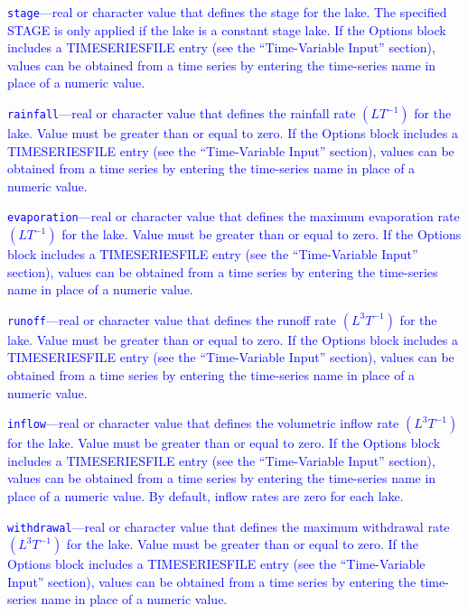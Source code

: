 \begin{description}
\item \textcolor{blue}{\texttt{stage}---real or character value that defines the stage for the lake. The specified STAGE is only applied if the lake is a constant stage lake. If the Options block includes a TIMESERIESFILE entry (see the ``Time-Variable Input'' section), values can be obtained from a time series by entering the time-series name in place of a numeric value.}

\item \textcolor{blue}{\texttt{rainfall}---real or character value that defines the rainfall rate $(LT^{-1})$ for the lake. Value must be greater than or equal to zero. If the Options block includes a TIMESERIESFILE entry (see the ``Time-Variable Input'' section), values can be obtained from a time series by entering the time-series name in place of a numeric value.}

\item \textcolor{blue}{\texttt{evaporation}---real or character value that defines the maximum evaporation rate $(LT^{-1})$ for the lake. Value must be greater than or equal to zero. If the Options block includes a TIMESERIESFILE entry (see the ``Time-Variable Input'' section), values can be obtained from a time series by entering the time-series name in place of a numeric value.}

\item \textcolor{blue}{\texttt{runoff}---real or character value that defines the runoff rate $(L^3 T^{-1})$ for the lake. Value must be greater than or equal to zero. If the Options block includes a TIMESERIESFILE entry (see the ``Time-Variable Input'' section), values can be obtained from a time series by entering the time-series name in place of a numeric value.}

\item \textcolor{blue}{\texttt{inflow}---real or character value that defines the volumetric inflow rate $(L^3 T^{-1})$ for the lake. Value must be greater than or equal to zero. If the Options block includes a TIMESERIESFILE entry (see the ``Time-Variable Input'' section), values can be obtained from a time series by entering the time-series name in place of a numeric value. By default, inflow rates are zero for each lake.}

\item \textcolor{blue}{\texttt{withdrawal}---real or character value that defines the maximum withdrawal rate $(L^3 T^{-1})$ for the lake. Value must be greater than or equal to zero. If the Options block includes a TIMESERIESFILE entry (see the ``Time-Variable Input'' section), values can be obtained from a time series by entering the time-series name in place of a numeric value.}


\end{description}
